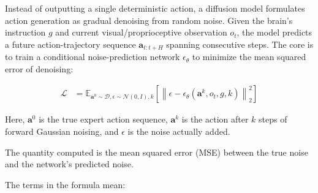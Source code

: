 Instead of outputting a single deterministic action, a diffusion model formulates action generation as gradual denoising from random noise. Given the brain's instruction \(g\) and current visual/proprioceptive observation \(o_t\), the model predicts a future action-trajectory sequence \(\mathbf{a}_{t:t+H}\) spanning consecutive steps. The core is to train a conditional noise-prediction network \(\epsilon_\theta\) to minimize the mean squared error of denoising:

\[
\begin{aligned}
\mathcal{L}
&=
\mathbb{E}_{\mathbf{a}^0\sim\mathcal{D},\epsilon\sim\mathcal{N}(0,I),k}
\left[
\left\|
\epsilon-\epsilon_\theta(\mathbf{a}^k,o_t,g,k)
\right\|_2^2
\right]
\end{aligned}
\]

Here, \(\mathbf{a}^0\) is the true expert action sequence, \(\mathbf{a}^k\) is the action after \(k\) steps of forward Gaussian noising, and \(\epsilon\) is the noise actually added.

The quantity computed is the mean squared error (MSE) between the true noise and the network's predicted noise.

The terms in the formula mean:

